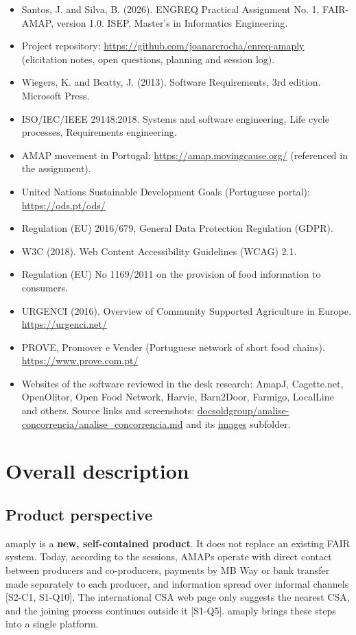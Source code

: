 \documentclass[11pt,a4paper]{article}
\begin{document}
\begin{itemize}
  \item [A] Santos, J. and Silva, B. (2026). ENGREQ Practical Assignment No. 1, FAIR-AMAP, version 1.0. ISEP, Master's in Informatics Engineering.
  \item [R1] Project repository: \url{https://github.com/joanarcrocha/enreq-amaply} (elicitation notes, open questions, planning and session log).
  \item [R2] Wiegers, K. and Beatty, J. (2013). Software Requirements, 3rd edition. Microsoft Press.
  \item [R3] ISO/IEC/IEEE 29148:2018. Systems and software engineering, Life cycle processes, Requirements engineering.
  \item [R4] AMAP movement in Portugal: \url{https://amap.movingcause.org/} (referenced in the assignment).
  \item [R5] United Nations Sustainable Development Goals (Portuguese portal): \url{https://ods.pt/ods/}
  \item [R6] Regulation (EU) 2016/679, General Data Protection Regulation (GDPR).
  \item [R7] W3C (2018). Web Content Accessibility Guidelines (WCAG) 2.1.
  \item [R8] Regulation (EU) No 1169/2011 on the provision of food information to consumers.
  \item [R9] URGENCI (2016). Overview of Community Supported Agriculture in Europe. \url{https://urgenci.net/}
  \item [R10] PROVE, Promover e Vender (Portuguese network of short food chains). \url{https://www.prove.com.pt/}
  \item [R11] Websites of the software reviewed in the desk research: AmapJ, Cagette.net, OpenOlitor, Open Food Network, Harvie, Barn2Door, Farmigo, LocalLine and others. Source links and screenshots: \url{docsoldgroup/analise-concorrencia/analise_concorrencia.md} and its \url{images} subfolder.
\end{itemize}

\section{Overall description}


\subsection{Product perspective}

amaply is a \textbf{new, self-contained product}. It does not replace an existing FAIR system. Today, according to the sessions, AMAPs operate with direct contact between producers and co-producers, payments by MB Way or bank transfer made separately to each producer, and information spread over informal channels [S2-C1, S1-Q10]. The international CSA web page only suggests the nearest CSA, and the joining process continues outside it [S1-Q5]. amaply brings these steps into a single platform.
\end{document}
